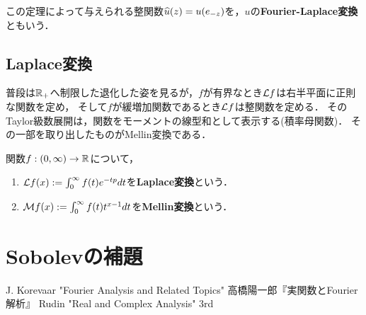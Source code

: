 \documentclass[uplatex,dvipdfmx]{jsreport}
\begin{document}
\begin{definition}
    この定理によって与えられる整関数$\widehat{u}(z)=u(e_{-z})$を，$u$の\textbf{Fourier-Laplace変換}ともいう．
\end{definition}

\subsection{Laplace変換}

\begin{tcolorbox}[colframe=ForestGreen, colback=ForestGreen!10!white,breakable,colbacktitle=ForestGreen!40!white,coltitle=black,fonttitle=\bfseries\sffamily,
title=]
    普段は$\mathbb{R}_+$へ制限した退化した姿を見るが，$f$が有界なとき$\mathcal{L} f$は右半平面に正則な関数を定め，
    そして$f$が緩増加関数であるとき$\mathcal{L} f$は整関数を定める．
    そのTaylor級数展開は，関数をモーメントの線型和として表示する(積率母関数)．
    その一部を取り出したものがMellin変換である．
\end{tcolorbox}

\begin{definition}
    関数$f:(0,\infty)\to\mathbb{R}$について，
    \begin{enumerate}
        \item $\mathcal{L} f(x):=\int^\infty_0f(t)e^{-tp}dt$を\textbf{Laplace変換}という．
        \item $\mathcal{M} f(x):=\int^\infty_0f(t)t^{x-1}dt$を\textbf{Mellin変換}という．
    \end{enumerate}
\end{definition}

\section{Sobolevの補題}

\begin{thebibliography}{9}
    J. Korevaar "Fourier Analysis and Related Topics"
    高橋陽一郎『実関数とFourier解析』
    Rudin "Real and Complex Analysis" 3rd
\end{thebibliography}
\end{document}
